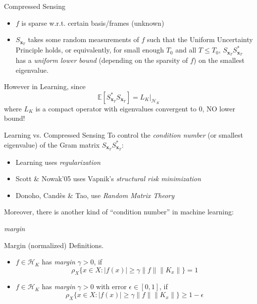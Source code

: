 \documentclass[pdf,slideColor,colorBG]{prosper}
\theoremstyle{theorem}
\theoremstyle{definition}
\theoremstyle{remark}
\def\E{{\mathbb E}}        %
\def\H{{\mathscr H}}
\def\x{{\mathbf x}}
\def\ga{{\gamma}}
\begin{document}
%
\begin{slide}{Compressed Sensing}
\begin{itemize}
\item $f$ is sparse w.r.t. certain basis/frames (unknown)
\item $S_{\x_T}$ takes some random measurements of $f$ such that the Uniform Uncertainty Principle holds, or
equivalently, for small enough $T_0$ and all $T\leq T_0$, $S_{\x_T} S^\ast_{\x_T}$ has a \emph{uniform lower bound} (depending on the sparsity of $f$)
on the smallest eigenvalue.
\end{itemize}
\medskip

However in Learning, since
\[ \E[S^\ast_{\x_T} S_{\x_T}] = L_K|_{\H_K} \]
where $L_K$ is a compact operator with eigenvalues convergent to $0$, NO lower bound!
\end{slide}

%
\begin{slide}{Learning vs. Compressed Sensing}
To control the \emph{condition number} (or smallest eigenvalue) of the Gram matrix $S_{\x_T}S_{\x_T}^\ast$:

\begin{itemize}
    \item Learning uses \emph{regularization}
    \item Scott \& Nowak'05 uses Vapnik's \emph{structural risk minimization}
    \item Donoho, Cand\`es \& Tao, use \emph{Random Matrix Theory}
\end{itemize}

\medskip

Moreover, there is another kind of ``condition number'' in machine learning: \\
\begin{center}
\emph{margin}
\end{center}
\end{slide}

%
\begin{slide}{Margin (normalized)}
Definitions.
\begin{itemize}
    \item $f\in \H_K$ has \emph{margin} $\ga>0$, if
\[ \rho_X \{x\in X: |f(x)|\geq \ga \|f\|\|K_x\| \} = 1 \]
    \item $f\in \H_K$ has \emph{margin} $\ga>0$ with error $\epsilon\in [0,1]$, if
\[ \rho_X \{x\in X: |f(x)|\geq \ga \|f\|\|K_x\| \} \geq 1-\epsilon \]
\end{itemize}

\end{slide}
\end{document}
